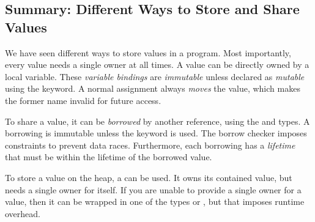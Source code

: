 \subsection{Summary: Different Ways to Store and Share Values}

We have seen different ways to store values in a \rust program.
Most importantly, every value needs a single owner at all times.
A value can be directly owned by a local variable.
These \emph{variable bindings} are \emph{immutable} unless declared as \emph{mutable} using the  keyword.
A normal assignment always \emph{moves} the value, which makes the former name invalid for future access.

To share a value, it can be \emph{borrowed} by another reference, using the  and  types.
A borrowing is immutable unless the  keyword is used.
The borrow checker imposes constraints to prevent data races.
Furthermore, each borrowing has a \emph{lifetime} that must be within the lifetime of the borrowed value.

To store a value on the heap, a  can be used.
It owns its contained value, but needs a single owner for itself.
If you are unable to provide a single owner for a value, then it can be wrapped in one of the types  or , but that imposes runtime overhead.
